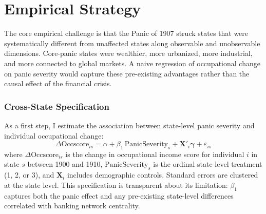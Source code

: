 \documentclass[12pt]{article}
\begin{document}
\section{Empirical Strategy}

The core empirical challenge is that the Panic of 1907 struck states that were systematically different from unaffected states along observable and unobservable dimensions. Core-panic states were wealthier, more urbanized, more industrial, and more connected to global markets. A naive regression of occupational change on panic severity would capture these pre-existing advantages rather than the causal effect of the financial crisis.

\subsubsection*{Cross-State Specification} As a first step, I estimate the association between state-level panic severity and individual occupational change:
\begin{equation}
\Delta \text{Occscore}_{is} = \alpha + \beta_1 \, \text{PanicSeverity}_s + \mathbf{X}'_i \boldsymbol{\gamma} + \varepsilon_{is}
\label{eq:cross}
\end{equation}
where $\Delta \text{Occscore}_{is}$ is the change in occupational income score for individual $i$ in state $s$ between 1900 and 1910, $\text{PanicSeverity}_s$ is the ordinal state-level treatment (1, 2, or 3), and $\mathbf{X}_i$ includes demographic controls. Standard errors are clustered at the state level. This specification is transparent about its limitation: $\beta_1$ captures both the panic effect and any pre-existing state-level differences correlated with banking network centrality.
\end{document}

